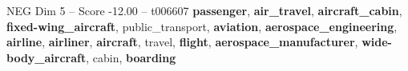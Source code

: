\begin{textsample}{NEG Dim 5 – Score -12.00 – t006607}  \label{ex:f5_neg_033}
\textbf{passenger}, \textbf{air\_travel}, \textbf{aircraft\_cabin}, \textbf{fixed-wing\_aircraft}, public\_transport, \textbf{aviation}, \textbf{aerospace\_engineering}, \textbf{airline}, \textbf{airliner}, \textbf{aircraft}, travel, \textbf{flight}, \textbf{aerospace\_manufacturer}, \textbf{wide-body\_aircraft}, cabin, \textbf{boarding}

\end{textsample}

